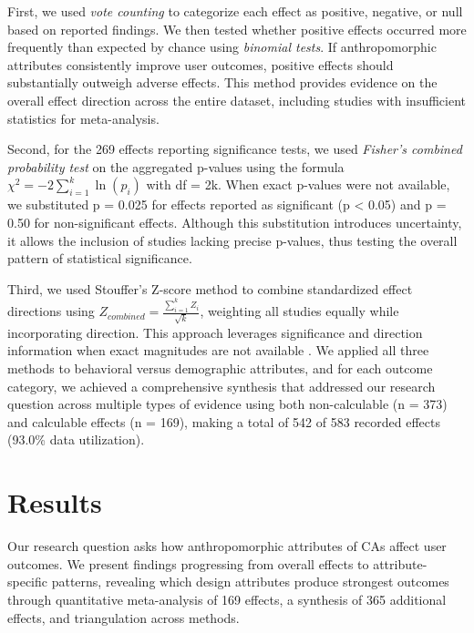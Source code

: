 \documentclass[manuscript,screen,review,anonymous]{acmart}
\begin{document}
First, we used \textit{vote counting} to categorize each effect as positive, negative, or null based on reported findings. We then tested whether positive effects occurred more frequently than expected by chance using \textit{binomial tests}. If anthropomorphic attributes consistently improve user outcomes, positive effects should substantially outweigh adverse effects. This method provides evidence on the overall effect direction across the entire dataset, including studies with insufficient statistics for meta-analysis. 

Second, for the 269 effects reporting significance tests, we used \textit{Fisher's combined probability test} \cite{fisher1932statistical} on the aggregated p-values using the formula $\chi^2 = -2\sum_{i=1}^{k} \ln(p_i)$ with df = 2k. When exact p-values were not available, we substituted p = 0.025 for effects reported as significant (p < 0.05) and p = 0.50 for non-significant effects. Although this substitution introduces uncertainty, it allows the inclusion of studies lacking precise p-values, thus testing the overall pattern of statistical significance. %

Third, we used Stouffer's Z-score method \cite{whitlock2005combining} to combine standardized effect directions using $Z_{combined} = \frac{\sum_{i=1}^{k} Z_i}{\sqrt{k}}$, weighting all studies equally while incorporating direction. This approach leverages significance and direction information when exact magnitudes are not available \cite{whitlock2005combining}.
We applied all three methods to behavioral versus demographic attributes, and for each outcome category, we achieved a comprehensive synthesis that addressed our research question across multiple types of evidence using both  %
non-calculable (n = 373) and calculable effects (n = 169), making a total of 542 of 583 recorded effects (93.0\% data utilization). 

\section{Results}

Our research question asks how anthropomorphic attributes of CAs affect user outcomes. We present findings progressing from overall effects to attribute-specific patterns, revealing which design attributes produce strongest outcomes through quantitative meta-analysis of 169 effects, a synthesis of 365 additional effects, and triangulation across methods.
\end{document}

